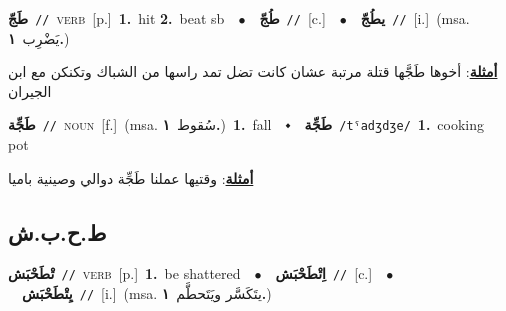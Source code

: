 \documentclass[10pt,a4paper,twoside]{article} %
\begin{document}
\begin{multicols}{2}
{\setlength\topsep{0pt}\textbf{\foreignlanguage{arabic}{طَجّ}}\ {\color{gray}\texttt{//}\color{black}}\ \textsc{verb}\ [p.]\ \textbf{1.}~hit  \textbf{2.}~beat sb\ \ $\bullet$\ \ \setlength\topsep{0pt}\textbf{\foreignlanguage{arabic}{طُجّ}}\ {\color{gray}\texttt{//}\color{black}}\ [c.]\ \ $\bullet$\ \ \setlength\topsep{0pt}\textbf{\foreignlanguage{arabic}{يطُجّ}}\ {\color{gray}\texttt{//}\color{black}}\ [i.]\ \color{gray}(msa. \foreignlanguage{arabic}{يَضْرِب}~\foreignlanguage{arabic}{\textbf{١.}})\color{black}\  \begin{flushright}\color{gray}\foreignlanguage{arabic}{\textbf{\underline{\foreignlanguage{arabic}{أمثلة}}}: أخوها طَجَّها قتلة مرتبة عشان كانت تضل تمد راسها من الشباك وتكنكن مع ابن الجيران}\end{flushright}\color{black}} \vspace{2mm}

{\setlength\topsep{0pt}\textbf{\foreignlanguage{arabic}{طَجِّة}}\ {\color{gray}\texttt{//}\color{black}}\ \textsc{noun}\ [f.]\ \color{gray}(msa. \foreignlanguage{arabic}{سُقوط}~\foreignlanguage{arabic}{\textbf{١.}})\color{black}\ \textbf{1.}~fall\ \ $\smblkdiamond$\ \ \setlength\topsep{0pt}\textbf{\foreignlanguage{arabic}{طَجِّة}}\ {\color{gray}\texttt{/tˤadʒdʒe/}\color{black}}\ \textbf{1.}~cooking pot\  \begin{flushright}\color{gray}\foreignlanguage{arabic}{\textbf{\underline{\foreignlanguage{arabic}{أمثلة}}}: وقتيها عملنا طَجِّة دوالي وصينية باميا}\end{flushright}\color{black}} \vspace{2mm}

\vspace{-3mm}
\subsection*{\color{blue}\foreignlanguage{arabic}{ط.ح.ب.ش}\color{blue}{}} 

{\setlength\topsep{0pt}\textbf{\foreignlanguage{arabic}{تْطَحْبَش}}\ {\color{gray}\texttt{//}\color{black}}\ \textsc{verb}\ [p.]\ \textbf{1.}~be shattered\ \ $\bullet$\ \ \setlength\topsep{0pt}\textbf{\foreignlanguage{arabic}{اِتْطَحْبَش}}\ {\color{gray}\texttt{//}\color{black}}\ [c.]\ \ $\bullet$\ \ \setlength\topsep{0pt}\textbf{\foreignlanguage{arabic}{يِتْطَحْبَش}}\ {\color{gray}\texttt{//}\color{black}}\ [i.]\ \color{gray}(msa. \foreignlanguage{arabic}{يتَكَسَّر ويَتَحطَّم}~\foreignlanguage{arabic}{\textbf{١.}})\color{black}\ } \vspace{2mm}


\end{multicols}
\end{document}
